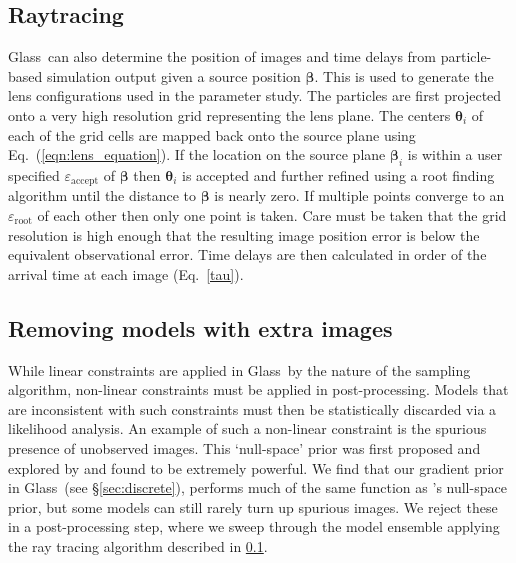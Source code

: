 \documentclass[galley,usenatbib]{mn2e}
\renewcommand{\vec}[1]{\ensuremath{\boldsymbol{#1}}}
\newcommand{\Glass}{{\sc Glass}}
\newcommand{\eps}{\ensuremath{\varepsilon}}
\newcommand{\eqnref}[1] {Eq.~(\ref{#1})}
\newcommand{\eqnrefp}[1] {(Eq.~\ref{#1})}
\newcommand{\secref}[1] {\S\ref{#1}}
\begin{document}
\subsection{Raytracing}\label{Raytracing}
\Glass\ can also determine the position of images and time delays from
particle-based simulation output given a source position $\vec\beta$. This is
used to generate the lens configurations used in the parameter study.  The
particles are first projected onto a very high resolution grid representing the
lens plane. The centers $\vec\theta_i$ of each of the grid cells are mapped
back onto the source plane using \eqnref{eqn:lens_equation}. If the location on
the source plane $\vec\beta_i$ is within a user specified
$\eps_\mathrm{accept}$ of $\vec\beta$ then $\vec\theta_i$ is accepted and
further refined using a root finding algorithm until the distance to
$\vec\beta$ is nearly zero. If multiple points converge to an
$\eps_\mathrm{root}$ of each other then only one point is taken.  Care must be
taken that the grid resolution is high enough that the resulting image position
error is below the equivalent observational error. Time delays are then
calculated in order of the arrival time at each image \eqnrefp{tau}.

\subsection{Removing models with extra images}\label{sec:glassextraimages} 
While linear constraints are applied in \Glass\ by the nature of the sampling
algorithm, non-linear constraints must be applied in post-processing. Models
that are inconsistent with such constraints must then be statistically
discarded via a likelihood analysis. An example of such a non-linear constraint
is the spurious presence of unobserved images. This `null-space' prior was
first proposed and explored by \citet{2006MNRAS.367.1209L} and found to be
extremely powerful. We find that our gradient prior in \Glass\ (see
\secref{sec:discrete}), performs much of the same function as
\citeauthor{2006MNRAS.367.1209L}'s null-space prior, but some models can still
rarely turn up spurious images. We reject these in a post-processing step,
where we sweep through the model ensemble applying the ray tracing algorithm
described in \ref{Raytracing}.
\end{document}
